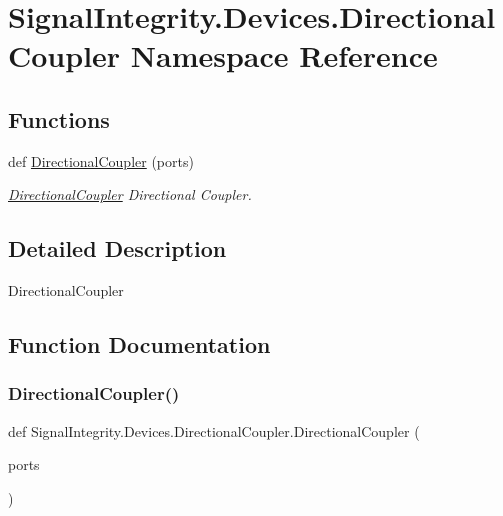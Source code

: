 \hypertarget{namespaceSignalIntegrity_1_1Devices_1_1DirectionalCoupler}{}\section{Signal\+Integrity.\+Devices.\+Directional\+Coupler Namespace Reference}
\label{namespaceSignalIntegrity_1_1Devices_1_1DirectionalCoupler}
\subsection*{Functions}
\begin{DoxyCompactItemize}
\item 
def \hyperlink{namespaceSignalIntegrity_1_1Devices_1_1DirectionalCoupler_a132696071d85ee104c5d11ccbd446957}{Directional\+Coupler} (ports)
\begin{DoxyCompactList}\small\item\em \hyperlink{namespaceSignalIntegrity_1_1Devices_1_1DirectionalCoupler}{Directional\+Coupler} Directional Coupler. \end{DoxyCompactList}\end{DoxyCompactItemize}


\subsection{Detailed Description}
\begin{DoxyVerb}DirectionalCoupler\end{DoxyVerb}
 

\subsection{Function Documentation}
\mbox{\label{namespaceSignalIntegrity_1_1Devices_1_1DirectionalCoupler_a132696071d85ee104c5d11ccbd446957}} 
\subsubsection{\texorpdfstring{Directional\+Coupler()}{DirectionalCoupler()}}
{\footnotesize\ttfamily def Signal\+Integrity.\+Devices.\+Directional\+Coupler.\+Directional\+Coupler (\begin{DoxyParamCaption}\item[{}]{ports }\end{DoxyParamCaption})}



